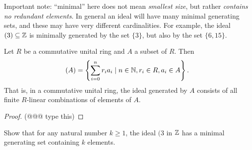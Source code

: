 Important note: ``minimal'' here does not mean \emph{smallest size}, but rather \emph{contains no redundant elements}.
In general an ideal will have many minimal generating sets, and these may have very different cardinalities.
For example, the ideal \((3) \subseteq \mathbb{Z}\) is minimally generated by the set \(\{3\}\), but also by the set \(\{6,15\}\).

\begin{prop}
Let \(R\) be a commutative unital ring and \(A\) a subset of \(R\).
Then \[ (A) = \left\{ \sum_{i=0}^n r_ia_i \mid n \in \mathbb{N}, r_i \in R, a_i \in A \right\}. \]
That is, in a commutative unital ring, the ideal generated by \(A\) consists of all finite \(R\)-linear combinations of elements of \(A\).
\end{prop}

\begin{proof}
(@@@ type this)
\end{proof}



\Exercises%

\begin{exercise}
Show that for any natural number \(k \geq 1\), the ideal \((3\) in \(\mathbb{Z}\) has a minimal generating set containing \(k\) elements.
\end{exercise}
